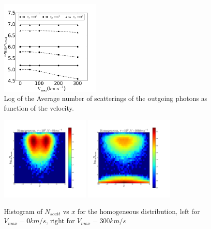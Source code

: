 \documentclass[usenatbib]{mn2e}
\begin{document}
\begin{figure}
    \includegraphics[width=0.45\textwidth]{NscattvsVmax.png}
\caption{Log of the Average number of scatterings of the outgoing photons as function of the velocity. \label{fig:Nscatt}} 
\end{figure}



\begin{figure}
     \includegraphics[width=0.40\textwidth]{2dHistogram0t5HOM.png}
     \includegraphics[width=0.40\textwidth]{2dHistogram300t5HOM.png}
    
    \caption{Histogram of $N_{scatt}$ vs $x$ for the homogeneous distribution, left for $V_{max}=0km/s $, right for $V_{max}=300km/s$ \label{fig:NscattHistoHOM}} 
\end{figure}
\end{document}
